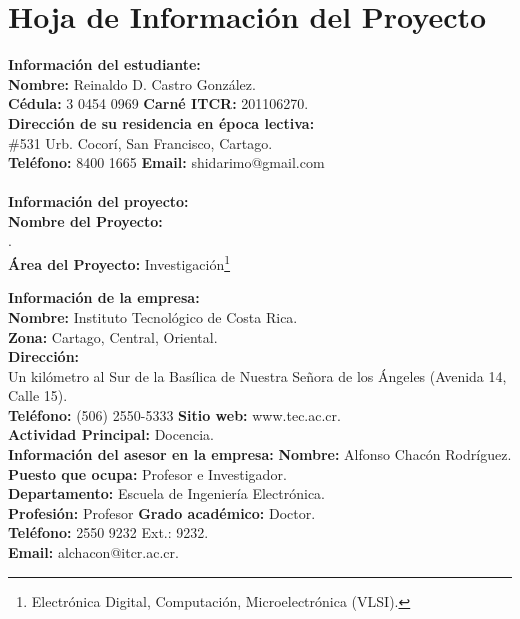 \chapter{Hoja de Información del Proyecto}

\textbf{Información del estudiante:}\\
\textbf{Nombre:} Reinaldo D. Castro González.\\
\textbf{Cédula:} 3 0454 0969 \textbf{Carné ITCR:} 201106270.\\
\textbf{Dirección de su residencia en época lectiva:}\\ \#531 Urb. Cocorí, San Francisco, Cartago.\\
\textbf{Teléfono:} 8400 1665 \textbf{Email:} shidarimo@gmail.com\\
\\
\textbf{Información del proyecto:}\\
\textbf{Nombre del Proyecto:}\\
\scriptTitle.\\
\textbf{Área del Proyecto:} Investigación\footnote{Electrónica Digital, Computación, Microelectrónica (VLSI).}

\textbf{Información de la empresa:}\\
\textbf{Nombre:} Instituto Tecnológico de Costa Rica.\\
\textbf{Zona:} Cartago, Central, Oriental.\\
\textbf{Dirección:}\\
Un kilómetro al Sur de la Basílica de Nuestra Señora de los Ángeles (Avenida 14, Calle 15).\\
\textbf{Teléfono:} (506) 2550-5333 \textbf{Sitio web:} www.tec.ac.cr.\\
\textbf{Actividad Principal:} Docencia.\\
\textbf{Información del asesor en la empresa:}
\textbf{Nombre:} Alfonso Chacón Rodríguez.\\
\textbf{Puesto que ocupa:} Profesor e Investigador.\\
\textbf{Departamento:} Escuela de Ingeniería Electrónica.\\
\textbf{Profesión:} Profesor \textbf{Grado académico:} Doctor.\\
\textbf{Teléfono:} 2550 9232 Ext.: 9232.\\
\textbf{Email:} alchacon@itcr.ac.cr.\\